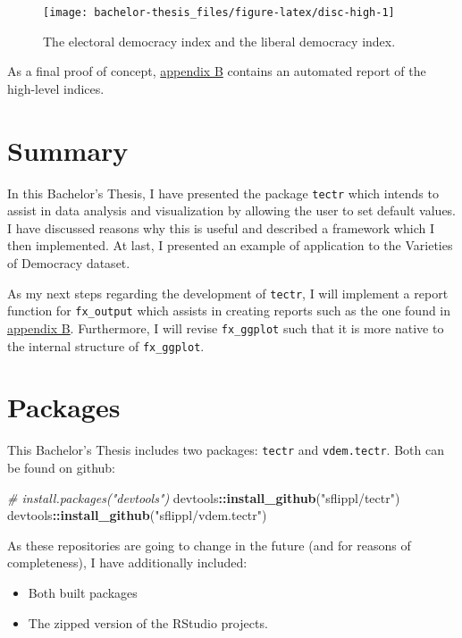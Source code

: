 \documentclass[]{report}
\newenvironment{Shaded}{\begin{snugshade}}{\end{snugshade}}
\newcommand{\KeywordTok}[1]{\textcolor[rgb]{0.13,0.29,0.53}{\textbf{#1}}}
\newcommand{\StringTok}[1]{\textcolor[rgb]{0.31,0.60,0.02}{#1}}
\newcommand{\CommentTok}[1]{\textcolor[rgb]{0.56,0.35,0.01}{\textit{#1}}}
\newcommand{\OperatorTok}[1]{\textcolor[rgb]{0.81,0.36,0.00}{\textbf{#1}}}
\newcommand{\NormalTok}[1]{#1}
\providecommand{\tightlist}{%
  \setlength{\itemsep}{0pt}\setlength{\parskip}{0pt}}
\theoremstyle{definition}
\theoremstyle{definition}
\theoremstyle{definition}
\theoremstyle{remark}
\begin{document}
\begin{figure}

{\centering \texttt{[image: bachelor-thesis\_files/figure-latex/disc-high-1]} 

}

\caption{The electoral democracy index and the liberal democracy index.}\label{fig:disc-high}
\end{figure}

As a final proof of concept, \protect\hyperlink{vardescs}{appendix B}
contains an automated report of the high-level indices.

\hypertarget{summary}{\chapter{Summary}\label{summary}}

In this Bachelor's Thesis, I have presented the package \texttt{tectr}
which intends to assist in data analysis and visualization by allowing
the user to set default values. I have discussed reasons why this is
useful and described a framework which I then implemented. At last, I
presented an example of application to the Varieties of Democracy
dataset.

As my next steps regarding the development of \texttt{tectr}, I will
implement a report function for \texttt{fx\_output} which assists in
creating reports such as the one found in
\protect\hyperlink{vardescs}{appendix B}. Furthermore, I will revise
\texttt{fx\_ggplot} such that it is more native to the internal
structure of \texttt{fx\_ggplot}.

\appendix


\chapter{Packages}\label{packages}

This Bachelor's Thesis includes two packages: \texttt{tectr} and
\texttt{vdem.tectr}. Both can be found on github:

\begin{Shaded}
\begin{Highlighting}[]
\CommentTok{# install.packages("devtools")}
\NormalTok{devtools}\OperatorTok{::}\KeywordTok{install_github}\NormalTok{(}\StringTok{"sflippl/tectr"}\NormalTok{)}
\NormalTok{devtools}\OperatorTok{::}\KeywordTok{install_github}\NormalTok{(}\StringTok{"sflippl/vdem.tectr"}\NormalTok{)}
\end{Highlighting}
\end{Shaded}

As these repositories are going to change in the future (and for reasons
of completeness), I have additionally included:

\begin{itemize}
\tightlist
\item
  Both built packages
\item
  The zipped version of the RStudio projects.
\end{itemize}


\end{document}
